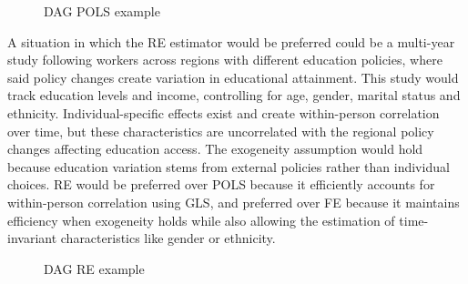 \begin{figure}[H]
\centering
{}
\caption{DAG POLS example}
\end{figure}
\vspace{-2em}

\newpage

A situation in which the RE estimator would be preferred could be a multi-year study following workers across regions with different education policies, where said policy changes create variation in educational attainment. This study would track education levels and income, controlling for age, gender, marital status and ethnicity. Individual-specific effects exist and create within-person correlation over time, but these characteristics are uncorrelated with the regional policy changes affecting education access. The exogeneity assumption would hold because education variation stems from external policies rather than individual choices. RE would be preferred over POLS because it efficiently accounts for within-person correlation using GLS, and preferred over FE because it maintains efficiency when exogeneity holds while also allowing the estimation of time-invariant characteristics like gender or ethnicity.

\begin{figure}[H]
\centering
{}
\caption{DAG RE example}
\end{figure}
\vspace{-2em}

